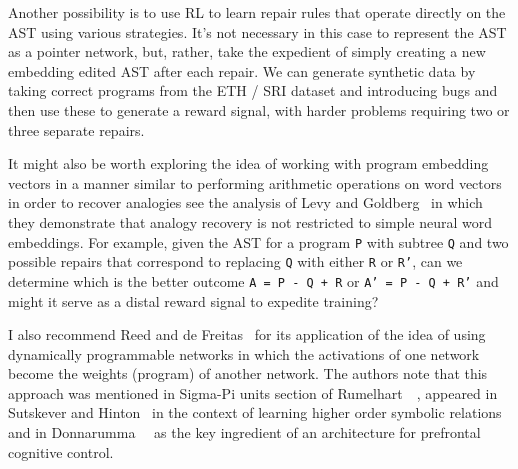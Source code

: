 Another possibility is to use RL to learn repair rules that operate directly on the AST using various strategies. It's not necessary in this case to represent the AST as a pointer network, but, rather, take the expedient of simply creating a new embedding edited AST after each repair. We can generate synthetic data by taking correct programs from the ETH / SRI dataset and introducing bugs and then use these to generate a reward signal, with harder problems requiring two or three separate repairs. 

It might also be worth exploring the idea of working with program embedding vectors in a manner similar to performing arithmetic operations on word vectors in order to recover analogies \emdash{} see the analysis of Levy and Goldberg~\cite{LevyandGoldbergCONIL-14} in which they demonstrate that analogy recovery is not restricted to simple neural word embeddings. For example, given the AST for a program {\tt{P}} with subtree {\tt{Q}} and two possible repairs that correspond to replacing {\tt{Q}} with either {\tt{R}} or {\tt{R'}}, can we determine which is the better outcome {\tt{A = P - Q + R}} or {\tt{A' = P - Q + R'}} and might it serve as a distal reward signal to expedite training?

I also recommend Reed and de Freitas~\cite{ReedandDeFreitasCoRR-15} for its application of the idea of using dynamically programmable networks in which the activations of one network become the weights (program) of another network.  The authors note that this approach was mentioned in Sigma-Pi units section of Rumelhart~\etal{}~\cite{RumelhartetalPDP-86b}, appeared in Sutskever and Hinton~\cite{SutskeverandHintonNIPS-09} in the context of learning higher order symbolic relations and in Donnarumma~\etal{}~\cite{DonnarummaetalIJNS-15} as the key ingredient of an architecture for prefrontal cognitive control.




